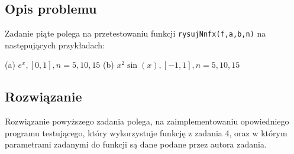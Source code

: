 \documentclass{article}
\begin{document}
\begin{center}
    \subsection{Opis problemu}
    \large Zadanie piąte polega na przetestowaniu funkcji \texttt{rysujNnfx(f,a,b,n)} na następujących przykładach: \newline
    \begin{flushleft}
        (a) \(e^x, [0,1], n = 5,10,15\) \newline
        (b) \(x^2\sin(x), [-1, 1], n=5,10,15\) \newline
    \end{flushleft}
    \subsection{Rozwiązanie}
     \large Rozwiązanie powyższego zadania polega, na zaimplementowaniu opowiedniego programu testującego, który wykorzystuje funkcję z zadania 4,
      oraz w którym parametrami zadanymi do funkcji są dane podane przez autora zadania. 

\end{center}
\end{document}
